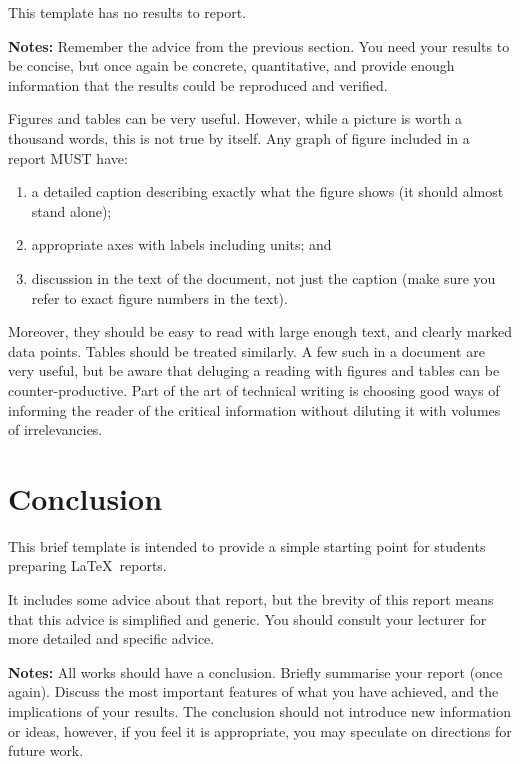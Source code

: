 \documentclass[12pt,a4paper]{article}
\begin{document}
This template has no results to report. 

\vspace{10mm}
\noindent \hrulefill

{\bf Notes:} Remember the advice from the previous section. You need
your results to be concise, but once again be concrete, quantitative,
and provide enough information that the results could be reproduced
and verified. 

Figures and tables can be very useful. However, while a picture is
worth a thousand words, this is not true by itself. Any graph of
figure included in a report MUST have:
\begin{enumerate}
\item a detailed caption describing exactly what the figure shows
  (it should almost stand alone);
\item appropriate axes with labels including
  units; and 
\item discussion in the text of the document, not just the caption
  (make sure you refer to exact figure numbers in the text).
\end{enumerate}
Moreover, they should be easy to read with large enough text, and
clearly marked data points.  Tables should be treated similarly.  A
few such in a document are very useful, but be aware that deluging a
reading with figures and tables can be counter-productive. Part of the
art of technical writing is choosing good ways of informing the reader
of the critical information without diluting it with volumes of
irrelevancies.




\clearpage
\section{Conclusion}

This brief template is intended to provide a simple starting point for
students preparing \LaTeX\ reports.
 
It includes some advice about that report, but the brevity of this
report means that this advice is simplified and generic. You should
consult your lecturer for more detailed and specific advice.

\vspace{10mm}
\noindent \hrulefill

{\bf Notes:} All works should have a conclusion. Briefly summarise
your report (once again). Discuss the most important features of what
you have achieved, and the implications of your results.  The
conclusion should not introduce new information or ideas, however, if
you feel it is appropriate, you may speculate on directions for future
work.
\end{document}
